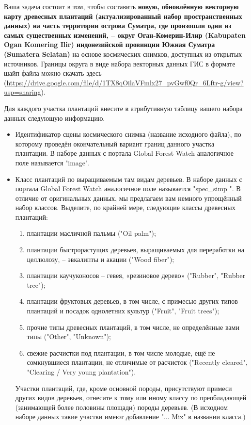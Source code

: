 Ваша задача состоит в том, чтобы составить \textbf{новую, обновлённую векторную карту древесных плантаций (актуализированный набор пространственных данных) на часть территории острова Суматра, где произошли одни из самых существенных изменений, – округ Оган-Комерин-Илир (Kabupaten Ogan Komering Ilir) индонезийской провинции Южная Суматра (Sumatera Selatan)} на основе космических снимков, доступных из открытых источников. Границы округа в виде набора векторных данных ГИС в формате шайп-файла можно скачать здесь (\url{https://drive.google.com/file/d/1TX8qOilaVFmlx27_pvGwf0Qr_6Lftr-g/view?usp=sharing}).

Для каждого участка плантаций внесите в атрибутивную таблицу вашего набора данных следующую информацию.
\begin{itemize}
    \item Идентификатор сцены космического снимка (название исходного файла), по которому проведён окончательный вариант границ данного участка плантации. В наборе данных с портала Global Forest Watch аналогичное поле называется "image".
    \item Класс плантаций по выращиваемым там видам деревьев. В наборе данных с портала Global Forest Watch аналогичное поле называется "spec\_simp ". В отличие от оригинальных данных, мы предлагаем вам немного упрощённый набор классов. Выделите, по крайней мере, следующие классы древесных плантаций:
    \begin{enumerate}
        \item плантации масличной пальмы ("Oil palm");
        \item плантации быстрорастущих деревьев, выращиваемых для переработки на целлюлозу, – эвкалипты и акации ("Wood fiber");
        \item плантации каучуконосов – гевея, «резиновое дерево» ("Rubber"{}, \linebreak "Rubber tree");
        \item плантации фруктовых деревьев, в том числе, с примесью других типов плантаций и посадок однолетних культур ("Fruit"{}, "Fruit trees");
        \item прочие типы древесных плантаций, в том числе, не определённые вами типы ("Other"{}, "Unknown");
        \item свежие расчистки под плантации, в том числе молодые, ещё не сомкнувшиеся плантации, не отличимые от расчисток ("Recently cleared"{}, "Clearing / Very young plantation").
    \end{enumerate}
    Участки плантаций, где, кроме основной породы, присутствуют примеси других видов деревьев, отнесите к тому или иному классу по преобладающей (занимающей более половины площади) породы деревьев. (В исходном наборе данных такие участки имеют добавление "$\dots$ Mix" в названии класса.)
\end{itemize}

